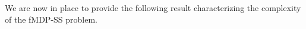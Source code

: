 \documentclass[twocolumn]{autart}    %
\newtheorem{problem}{Problem}
\newtheorem{lemma}{Lemma}
\begin{document}
 
 

 
 
We are now in place to provide the following result characterizing the complexity of the fMDP-SS problem.\\
\end{document}
